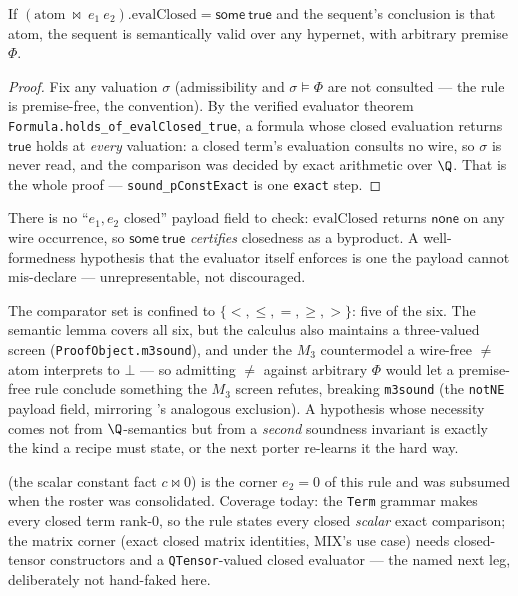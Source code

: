 \begin{bprop}\label{prop:pce-sound}
If $(\mathrm{atom}\ \bowtie\ e_1\ e_2).\mathrm{evalClosed} =
\mathsf{some\ true}$ and the sequent's conclusion is that atom, the
sequent is semantically valid over any hypernet, with arbitrary premise
$\Phi$.
\end{bprop}
\begin{proof}
Fix any valuation $\sigma$ (admissibility and $\sigma \models \Phi$ are
not consulted --- the rule is premise-free, the 
convention). By the verified evaluator theorem
\texttt{Formula.holds\_of\_evalClosed\_true}, a formula whose closed
evaluation returns $\mathsf{true}$ holds at \emph{every} valuation: a
closed term's evaluation consults no wire, so $\sigma$ is never read, and
the comparison was decided by exact arithmetic over $\Q$. That is the
whole proof --- \texttt{sound\_pConstExact} is one \texttt{exact} step.
\end{proof}

\begin{bremark}
There is no ``$e_1, e_2$ closed'' payload field to check:
$\mathrm{evalClosed}$ returns $\mathsf{none}$ on any wire occurrence, so
$\mathsf{some\ true}$ \emph{certifies} closedness as a byproduct. A
well-formedness hypothesis that the evaluator itself enforces is one the
payload cannot mis-declare --- unrepresentable, not discouraged.
\end{bremark}

\begin{bremark}
The comparator set is confined to $\{<, \leq, =, \geq, >\}$: five of the
six. The semantic lemma covers all six, but the calculus also maintains a
three-valued screen (\texttt{ProofObject.m3sound}), and under the $M_3$
countermodel a wire-free $\neq$ atom interprets to $\bot$ --- so admitting
$\neq$ against arbitrary $\Phi$ would let a premise-free rule conclude
something the $M_3$ screen refutes, breaking \texttt{m3sound} (the
\texttt{notNE} payload field, mirroring 's analogous
exclusion). A
hypothesis whose necessity comes not from $\Q$-semantics but from a
\emph{second} soundness invariant is exactly the kind a recipe must state,
or the next porter re-learns it the hard way.
\end{bremark}

\begin{bremark}
 (the scalar constant fact $c \bowtie 0$) is the corner
$e_2 = 0$ of this rule and was subsumed when the roster was consolidated. Coverage today:
the \texttt{Term} grammar makes every closed term rank-0, so the rule
states every closed \emph{scalar} exact comparison; the matrix corner
(exact closed matrix identities, MIX's use case) needs closed-tensor
constructors and a \texttt{QTensor}-valued closed evaluator --- the named
next leg, deliberately not hand-faked here.
\end{bremark}

